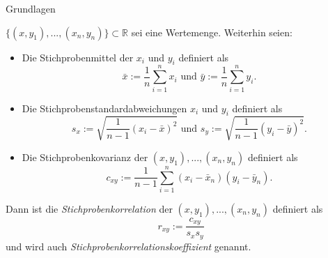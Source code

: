 \documentclass[
  8pt,
  ignorenonframetext,
]{beamer}
\begin{document}
\begin{frame}{Grundlagen}
\protect\hypertarget{grundlagen-4}{}
\footnotesize
\begin{definition}[Stichprobenkorrelation]
\justifying
$\{(x,y_1),...,(x_n,y_n)\} \subset \mathbb{R}$ sei eine Wertemenge. Weiterhin seien:
\begin{itemize}
\item Die Stichprobenmittel der $x_i$ und $y_i$ definiert als
\begin{equation}
\bar{x} := \frac{1}{n}\sum_{i=1}^n x_i
\mbox{ und }
\bar{y} := \frac{1}{n}\sum_{i=1}^n y_i.
\end{equation}
\item Die Stichprobenstandardabweichungen $x_i$ und $y_i$ definiert als
\begin{equation}
s_x := \sqrt{\frac{1}{n-1}(x_i - \bar{x})^2}
\mbox{ und }
s_y := \sqrt{\frac{1}{n-1}(y_i - \bar{y})^2}.
\end{equation}
\item Die Stichprobenkovarianz der $(x,y_1),...,(x_n,y_n)$ definiert als
\begin{equation}
c_{xy} := \frac{1}{n-1}\sum_{i=1}^n (x_i - \bar{x}_n)(y_i - \bar{y}_n).
\end{equation}
\end{itemize}
Dann ist die \textit{Stichprobenkorrelation} der $(x,y_1),...,(x_n,y_n)$ definiert als
\begin{equation}
r_{xy} := \frac{c_{xy}}{s_xs_y}
\end{equation}
und  wird auch \textit{Stichprobenkorrelationskoeffizient} genannt.
\end{definition}
\end{frame}
\end{document}
